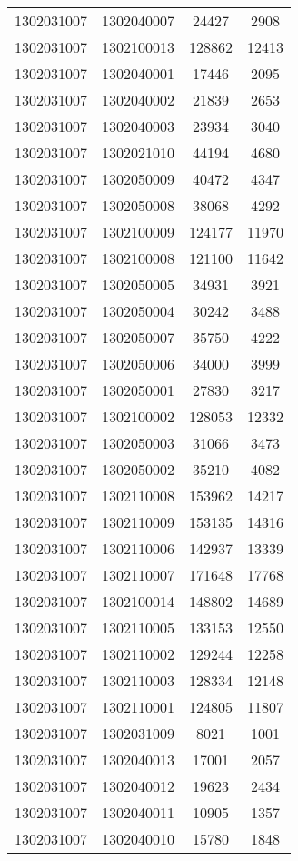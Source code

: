\begin{longtable}{llcc}
1302031007 & 1302040007 & 24427 & 2908\\
1302031007 & 1302100013 & 128862 & 12413\\
1302031007 & 1302040001 & 17446 & 2095\\
1302031007 & 1302040002 & 21839 & 2653\\
1302031007 & 1302040003 & 23934 & 3040\\
1302031007 & 1302021010 & 44194 & 4680\\
1302031007 & 1302050009 & 40472 & 4347\\
1302031007 & 1302050008 & 38068 & 4292\\
1302031007 & 1302100009 & 124177 & 11970\\
1302031007 & 1302100008 & 121100 & 11642\\
1302031007 & 1302050005 & 34931 & 3921\\
1302031007 & 1302050004 & 30242 & 3488\\
1302031007 & 1302050007 & 35750 & 4222\\
1302031007 & 1302050006 & 34000 & 3999\\
1302031007 & 1302050001 & 27830 & 3217\\
1302031007 & 1302100002 & 128053 & 12332\\
1302031007 & 1302050003 & 31066 & 3473\\
1302031007 & 1302050002 & 35210 & 4082\\
1302031007 & 1302110008 & 153962 & 14217\\
1302031007 & 1302110009 & 153135 & 14316\\
1302031007 & 1302110006 & 142937 & 13339\\
1302031007 & 1302110007 & 171648 & 17768\\
1302031007 & 1302100014 & 148802 & 14689\\
1302031007 & 1302110005 & 133153 & 12550\\
1302031007 & 1302110002 & 129244 & 12258\\
1302031007 & 1302110003 & 128334 & 12148\\
1302031007 & 1302110001 & 124805 & 11807\\
1302031007 & 1302031009 & 8021 & 1001\\
1302031007 & 1302040013 & 17001 & 2057\\
1302031007 & 1302040012 & 19623 & 2434\\
1302031007 & 1302040011 & 10905 & 1357\\
1302031007 & 1302040010 & 15780 & 1848\\

\end{longtable}
